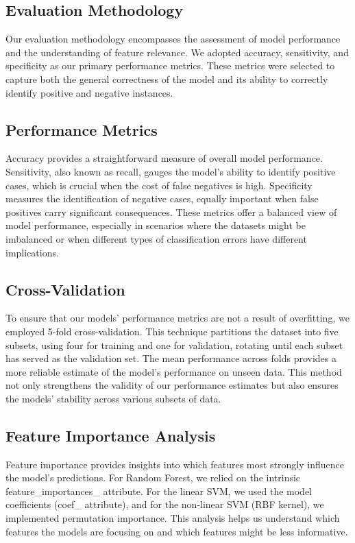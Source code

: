 \documentclass[12pt]{article}
\begin{document}
\subsection*{Evaluation Methodology}
Our evaluation methodology encompasses the assessment of model performance and the understanding of feature relevance. We adopted accuracy, sensitivity, and specificity as our primary performance metrics. These metrics were selected to capture both the general correctness of the model and its ability to correctly identify positive and negative instances.

\subsection*{Performance Metrics}
Accuracy provides a straightforward measure of overall model performance. Sensitivity, also known as recall, gauges the model's ability to identify positive cases, which is crucial when the cost of false negatives is high. Specificity measures the identification of negative cases, equally important when false positives carry significant consequences. These metrics offer a balanced view of model performance, especially in scenarios where the datasets might be imbalanced or when different types of classification errors have different implications.

\subsection*{Cross-Validation}
To ensure that our models' performance metrics are not a result of overfitting, we employed 5-fold cross-validation. This technique partitions the dataset into five subsets, using four for training and one for validation, rotating until each subset has served as the validation set. The mean performance across folds provides a more reliable estimate of the model's performance on unseen data. This method not only strengthens the validity of our performance estimates but also ensures the models' stability across various subsets of data.

\subsection*{Feature Importance Analysis}
Feature importance provides insights into which features most strongly influence the model's predictions. For Random Forest, we relied on the intrinsic feature\_importances\_ attribute. For the linear SVM, we used the model coefficients (coef\_ attribute), and for the non-linear SVM (RBF kernel), we implemented permutation importance. This analysis helps us understand which features the models are focusing on and which features might be less informative.
\end{document}
